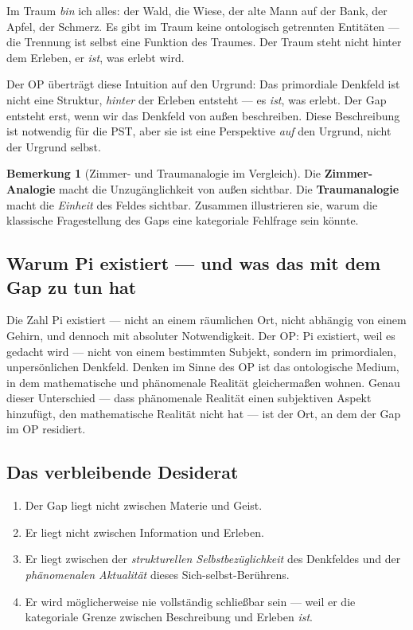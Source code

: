 \documentclass[11pt,a4paper]{article}
\theoremstyle{plain}
\theoremstyle{definition}
\newtheorem{remark}{Bemerkung}[section]
\begin{document}
Im Traum \emph{bin} ich alles: der Wald, die Wiese, der alte Mann auf der Bank, der
Apfel, der Schmerz. Es gibt im Traum keine ontologisch getrennten Entit\"{a}ten --- die
Trennung ist selbst eine Funktion des Traumes. Der Traum steht nicht \glqq{}hinter\grqq{}
dem Erleben, er \emph{ist}, was erlebt wird.

Der OP \"{u}bertr\"{a}gt diese Intuition auf den Urgrund: Das primordiale Denkfeld ist
nicht eine Struktur, \emph{hinter} der Erleben entsteht --- es \emph{ist}, was erlebt.
Der Gap entsteht erst, wenn wir das Denkfeld von \glqq{}au\ss{}en\grqq{} beschreiben.
Diese Beschreibung ist notwendig f\"{u}r die PST, aber sie ist eine Perspektive
\emph{auf} den Urgrund, nicht der Urgrund selbst.

\begin{remark}[Zimmer- und Traumanalogie im Vergleich]
Die \textbf{Zimmer-Analogie} macht die Unzug\"{a}nglichkeit von au\ss{}en sichtbar. Die
\textbf{Traumanalogie} macht die \emph{Einheit} des Feldes sichtbar. Zusammen
illustrieren sie, warum die klassische Fragestellung des Gaps eine kategoriale Fehlfrage
sein k\"{o}nnte.
\end{remark}

\subsection{Warum Pi existiert --- und was das mit dem Gap zu tun hat}

Die Zahl Pi existiert --- nicht an einem r\"{a}umlichen Ort, nicht abh\"{a}ngig von einem
Gehirn, und dennoch mit absoluter Notwendigkeit. Der OP: Pi existiert, weil es gedacht
wird --- nicht von einem bestimmten Subjekt, sondern im primordialen, unpersönlichen
Denkfeld. \glqq{}Denken\grqq{} im Sinne des OP ist das ontologische Medium, in dem
mathematische und ph\"{a}nomenale Realit\"{a}t gleicherma\ss{}en wohnen. Genau dieser
Unterschied --- dass ph\"{a}nomenale Realit\"{a}t einen subjektiven Aspekt hinzuf\"{u}gt,
den mathematische Realit\"{a}t nicht hat --- ist der Ort, an dem der Gap im OP residiert.

\subsection{Das verbleibende Desiderat}

\begin{enumerate}
  \item Der Gap liegt nicht zwischen Materie und Geist.
  \item Er liegt nicht zwischen Information und Erleben.
  \item Er liegt zwischen der \emph{strukturellen Selbstbez\"{u}glichkeit} des Denkfeldes
        und der \emph{ph\"{a}nomenalen Aktualit\"{a}t} dieses Sich-selbst-Ber\"{u}hrens.
  \item Er wird m\"{o}glicherweise nie vollst\"{a}ndig schlie\ss{}bar sein --- weil er die
        kategoriale Grenze zwischen Beschreibung und Erleben \emph{ist}.
\end{enumerate}
\end{document}
